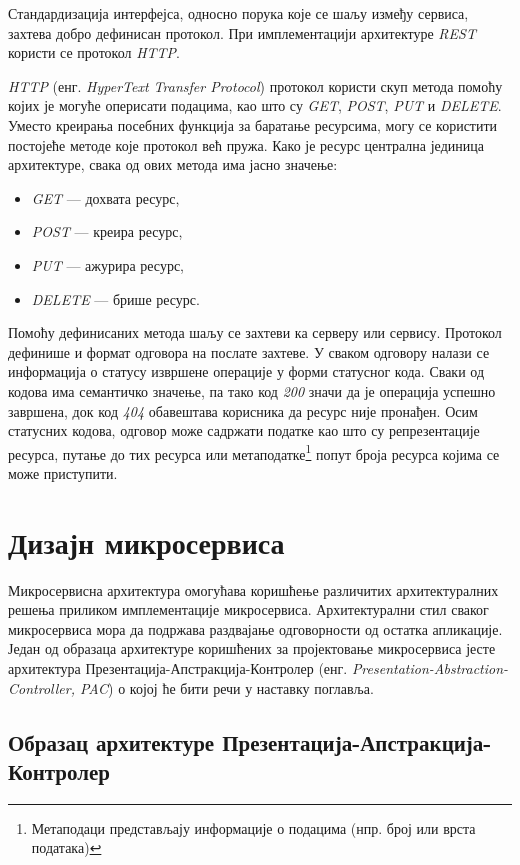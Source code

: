 \documentclass[12pt,oneside]{memoir}
\begin{document}
Стандардизација интерфејса, односно порука које се шаљу између сервиса, захтева добро дефинисан протокол. При имплементацији архитектуре \textit{REST} користи се протокол \textit{HTTP}.

\textit{HTTP} (енг. \textit{HyperText Transfer Protocol}) протокол користи скуп метода помоћу којих је могуће оперисати подацима, као што су \textit{GET}, \textit{POST}, \textit{PUT} и \textit{DELETE}.  Уместо креирања посебних функција за баратање ресурсима, могу се користити постојеће методе које протокол већ пружа. Како је ресурс централна јединица архитектуре, свака од ових метода има јасно значење: 
\begin{itemize}
\item \textit{GET} --- дохвата ресурс,
\item \textit{POST} --- креира ресурс,
\item \textit{PUT} --- ажурира ресурс,
\item \textit{DELETE} --- брише ресурс.
\end{itemize}

Помоћу дефинисаних метода шаљу се захтеви ка серверу или сервису. Протокол дефинише и формат одговора на послате захтеве. У сваком одговору налази се информација о статусу извршене операције у форми статусног кода. Сваки од кодова има семантичко значење, па тако код \textit{200} значи да је операција успешно завршена, док код \textit{404} обавештава корисника да ресурс није пронађен. Осим статусних кодова, одговор може садржати податке као што су репрезентације ресурса, путање до тих ресурса или метаподатке\footnote{Метаподаци представљају информације о подацима (нпр. број или врста података)} попут броја ресурса којима се може приступити.

\section{Дизајн микросервиса}

Микросервисна архитектура омогућава коришћење различитих архитектуралних решења приликом имплементације микросервиса. Архитектурални стил сваког микросервиса мора да подржава раздвајање одговорности од остатка апликације. Један од образаца архитектуре коришћених за пројектовање микросервиса јесте архитектура Презентација-Апстракција-Контролер (енг.\textit{ Presentation-Abstraction-Controller, PAC}) о којој ће бити речи у наставку поглавља.

\subsection{Образац архитектуре Презентација-Апстракција-Контролер}
\end{document}
